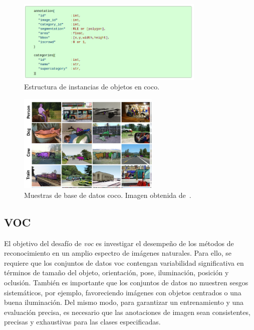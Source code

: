\begin{figure}[H]
	\begin{center}
		\includegraphics[width=0.8\textwidth]{figures/instancia_objetos.png}
		\caption{Estructura de instancias de objetos en \acrshort{coco}.}
		\label{fig.objInst}
	\end{center}
\end{figure}

\begin{figure}[H]
	\begin{center}
		\includegraphics[width=0.6\textwidth]{figures/coco}
		\caption{Muestras de base de datos \acrshort{coco}. Imagen obtenida de~\cite{coco}.}
	\end{center}
\end{figure}

\subsection{VOC} \label{sec.voc}
El objetivo del desafío de \textit{\acrfull{voc}} \cite{Everingham10} es investigar el desempeño de los métodos de reconocimiento en un amplio espectro de imágenes naturales. Para ello, se requiere que los conjuntos de datos \acrshort{voc} contengan variabilidad significativa en términos de tamaño del objeto, orientación, pose, iluminación, posición y oclusión. También es importante que los conjuntos de datos no muestren sesgos sistemáticos, por ejemplo, favoreciendo imágenes con objetos centrados o una buena iluminación. Del mismo modo, para garantizar un entrenamiento y una evaluación precisa, es necesario que las anotaciones de imagen sean consistentes, precisas y exhaustivas para las clases especificadas.\\

